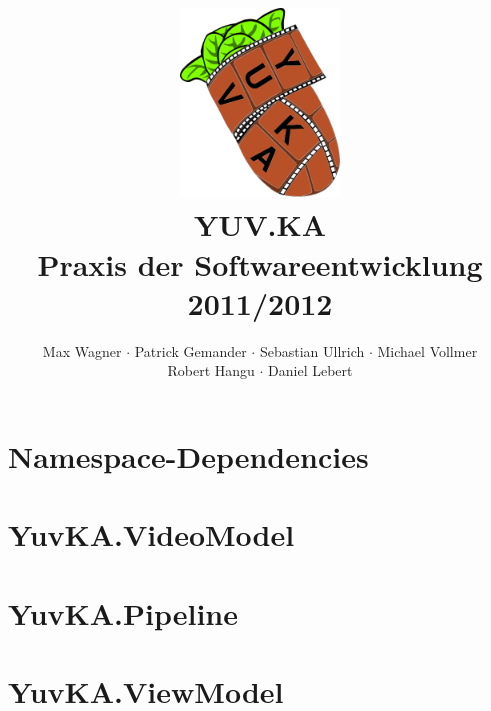 \documentclass{scrartcl}
\begin{document}
\title{
    \hspace{-0.5cm} \includegraphics[height=5cm]{logo.png} \\[1cm]
    \Huge{YUV.KA} \\ \large{Praxis der Softwareentwicklung 2011/2012}
}
\author{Max Wagner $\cdot$ Patrick Gemander $\cdot$ Sebastian Ullrich $\cdot$ Michael Vollmer \\ Robert Hangu $\cdot$ Daniel Lebert}
\maketitle

\newpage
\mbox{}
\newpage
\mbox{}

\tableofcontents
\section{Namespace-Dependencies}

\section{YuvKA.VideoModel}


\section{YuvKA.Pipeline}







\section{YuvKA.ViewModel}


\end{document}
